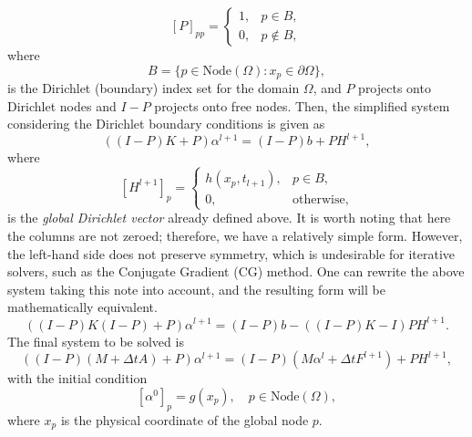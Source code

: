 \documentclass[a4paper, 11pt]{article}
\theoremstyle{plain}
\theoremstyle{definition}
\theoremstyle{remark}
\begin{document}
\begin{equation*}
    \left[P\right]_{pp} = 
    \begin{cases}
        1, & p\in B,\\
        0, & p\notin B,
    \end{cases}
\end{equation*}
where 
\begin{equation*}
    B = \{p\in \text{Node}(\Omega): x_p\in \partial \Omega\},
\end{equation*}
is the Dirichlet (boundary) index set for the domain $\Omega$, and $P$ projects onto Dirichlet nodes and $I - P$ projects onto free nodes. Then, the simplified system considering the Dirichlet boundary conditions is given as
\begin{equation*}
    \left(\left(I - P\right)K + P\right)\alpha^{l+1} = \left(I - P\right)b + PH^{l+1},
\end{equation*}
where 
\begin{equation*}
    \left[H^{l+1}\right]_{p} = 
    \begin{cases}
        h(x_{p}, t_{l+1}), & p\in B,\\
        0, & \text{otherwise},
    \end{cases}
\end{equation*}
is the \textit{global Dirichlet vector} already defined above. It is worth noting that here the columns are not zeroed; therefore, we have a relatively simple form. However, the left-hand side does not preserve symmetry, which is undesirable for iterative solvers, such as the Conjugate Gradient (CG) method. One can rewrite the above system taking this note into account, and the resulting form will be mathematically equivalent.
\begin{equation*}
    \left(\left(I - P\right)K\left(I - P\right) + P\right)\alpha^{l+1} = \left(I - P\right)b - \left((I - P)K - I\right)PH^{l+1}.
\end{equation*}
The final system to be solved is 
\begin{equation*}
    \left(\left(I - P\right)\left(M + \Delta t A\right) + P\right)\alpha^{l+1} = \left(I - P\right)\left(M \alpha^{l} + \Delta tF^{l+1}\right) + PH^{l+1},
\end{equation*}
with the initial condition
\begin{equation*}
    \left[\alpha^{0}\right]_{p} = g(x_{p}), \quad p\in \text{Node}(\Omega),
\end{equation*}
where $x_p$ is the physical coordinate of the global node $p$. \vspace{10pt}
\end{document}
